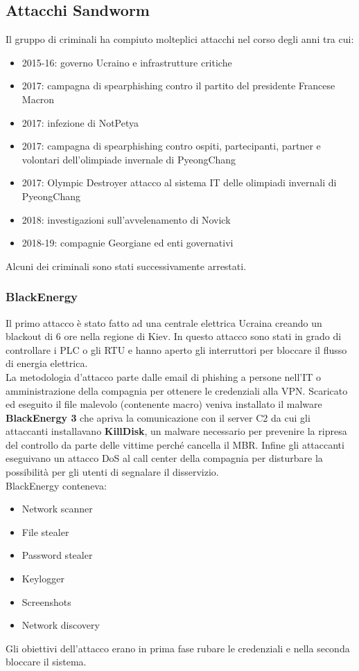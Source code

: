 \subsection{Attacchi Sandworm}
Il gruppo di criminali ha compiuto molteplici attacchi nel corso degli anni tra cui:
\begin{itemize}[noitemsep]
    \item 2015-16: governo Ucraino e infrastrutture critiche
    \item 2017: campagna di spearphishing contro il partito del presidente Francese Macron
    \item 2017: infezione di NotPetya
    \item 2017: campagna di spearphishing contro ospiti, partecipanti, partner e volontari dell'olimpiade invernale di PyeongChang
    \item 2017: Olympic Destroyer attacco al sistema IT delle olimpiadi invernali di PyeongChang
    \item 2018: investigazioni sull'avvelenamento di Novick
    \item 2018-19: compagnie Georgiane ed enti governativi
\end{itemize}
Alcuni dei criminali sono stati successivamente arrestati.\\

\subsubsection{BlackEnergy}
Il primo attacco è stato fatto ad una centrale elettrica Ucraina creando un blackout di 6 ore nella regione di Kiev.
In questo attacco sono stati in grado di controllare i \acrshort{PLC} o gli \acrfull{RTU} e hanno aperto gli interruttori per bloccare il flusso di energia elettrica.\\
La metodologia d'attacco parte dalle email di phishing a persone nell'IT o amministrazione della compagnia per ottenere le credenziali alla \acrshort{VPN}.
Scaricato ed eseguito il file malevolo (contenente macro) veniva installato il malware \textbf{BlackEnergy 3} che apriva la comunicazione con il server \acrshort{C2} da cui gli attaccanti installavano \textbf{KillDisk}, un malware necessario per prevenire la ripresa del controllo da parte delle vittime perché cancella il \acrfull{MBR}.
Infine gli attaccanti eseguivano un attacco \acrshort{DoS} al call center della compagnia per disturbare la possibilità per gli utenti di segnalare il disservizio.\\
BlackEnergy conteneva:
\begin{itemize}[noitemsep]
    \item Network scanner
    \item File stealer
    \item Password stealer
    \item Keylogger
    \item Screenshots
    \item Network discovery
\end{itemize}
Gli obiettivi dell'attacco erano in prima fase rubare le credenziali e nella seconda bloccare il sistema.

